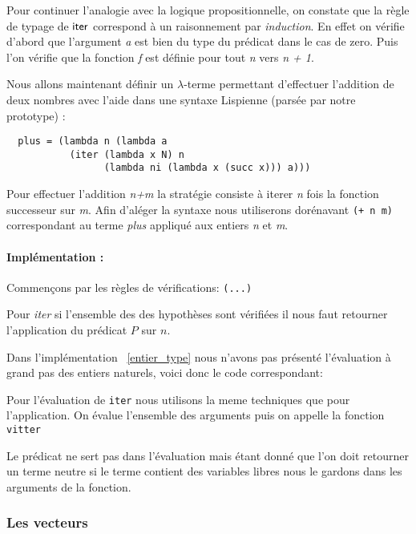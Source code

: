 \documentclass {article}
\newcommand{\codefrom}[3]
           {}
\theoremstyle{definition}
\theoremstyle{remark}
\newcommand{\fun}[1]{\lstinline!#1!}
\begin{document}
Pour continuer l'analogie avec la logique propositionnelle, on constate que la règle de typage de $\mathsf{iter}$ correspond à un raisonnement par
\emph{induction}. En effet on vérifie d'abord que l'argument \emph{a} est bien du type du prédicat dans le cas de zero. 
Puis l'on vérifie que la fonction \emph{f} est définie pour tout \emph{n} vers \emph{n + 1}.

Nous allons maintenant définir un $\lambda$-terme permettant d'effectuer l'addition de deux nombres avec l'aide dans une syntaxe
Lispienne (parsée par notre prototype) :
\begin{lstlisting}
  plus = (lambda n (lambda a 
           (iter (lambda x N) n 
                 (lambda ni (lambda x (succ x))) a)))
\end{lstlisting}
Pour effectuer l'addition \emph{n\:+\:m} la stratégie consiste à iterer \emph{n} fois la fonction successeur sur \emph{m}.
Afin d'aléger la syntaxe nous utiliserons dorénavant \lstinline!(+ n m)! correspondant au terme \emph{plus} appliqué aux entiers \emph{n} et
\emph{m}.

\paragraph{Implémentation :} 

Commençons par les règles de vérifications:
\codefrom{dependent}{lambda}{check_head}\lstinline!(...)!
\codefrom{dependent}{lambda}{check_nat}

Pour \emph{iter} si l'ensemble des des hypothèses sont vérifiées il nous faut retourner l'application
du prédicat $P$ sur $n$.
\codefrom{dependent}{lambda}{synth_iter}

Dans l'implémentation ~\ref{entier_type} nous n'avons pas présenté l'évaluation à grand pas des entiers naturels, 
voici donc le code correspondant:
\codefrom{dependent}{lambda}{big_step_nat}

Pour l'évaluation de \fun{iter} nous utilisons la meme techniques que pour 
l'application. On évalue l'ensemble des arguments puis on appelle la fonction \fun{vitter}
\codefrom{dependent}{lambda}{big_step_iter}

Le prédicat ne sert pas dans l'évaluation mais étant donné que l'on doit retourner 
un terme neutre si le terme contient des variables libres nous le gardons dans les arguments de la
fonction.
\codefrom{dependent}{lambda}{vitter}

\subsubsection{Les vecteurs}
\end{document}
